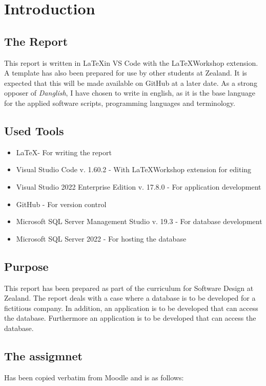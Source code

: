 \chapter{Introduction}
\label{chapter:introduction}

\section{The Report}
This report is written in \LaTeX  in VS Code with the \LaTeX  Workshop extension.
A template has also been prepared for use by other students at Zealand. It is expected that this will be made available on GitHub at a later date.
As a strong opposer of \emph{Danglish}, I have chosen to write in english, as it is the base language for the applied software scripts, programming languages and terminology.

\section{Used Tools}
\begin{itemize}
    \item \LaTeX  - For writing the report
    \item Visual Studio Code v. 1.60.2 - With \LaTeX  Workshop extension for editing
    \item Visual Studio 2022 Enterprise Edition v. 17.8.0 - For application development
    \item GitHub - For version control
    \item Microsoft SQL Server Management Studio v. 19.3 - For database development
    \item Microsoft SQL Server 2022 - For hosting the database
\end{itemize}

\section{Purpose}
This report has been prepared as part of the curriculum for Software Design at Zealand. The report deals with a case where a database is to be developed for a fictitious company. In addition, an application is to be developed that can access the database.
Furthermore an application is to be developed that can access the database.

\section{The assigmnet}
Has been copied verbatim from Moodle and is as follows:

